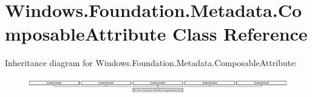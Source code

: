 \hypertarget{class_windows_1_1_foundation_1_1_metadata_1_1_composable_attribute}{}\section{Windows.\+Foundation.\+Metadata.\+Composable\+Attribute Class Reference}
\label{class_windows_1_1_foundation_1_1_metadata_1_1_composable_attribute}
Inheritance diagram for Windows.\+Foundation.\+Metadata.\+Composable\+Attribute\+:\begin{figure}[H]
\begin{center}
\leavevmode
\includegraphics[height=0.715655cm]{class_windows_1_1_foundation_1_1_metadata_1_1_composable_attribute}
\end{center}
\end{figure}
